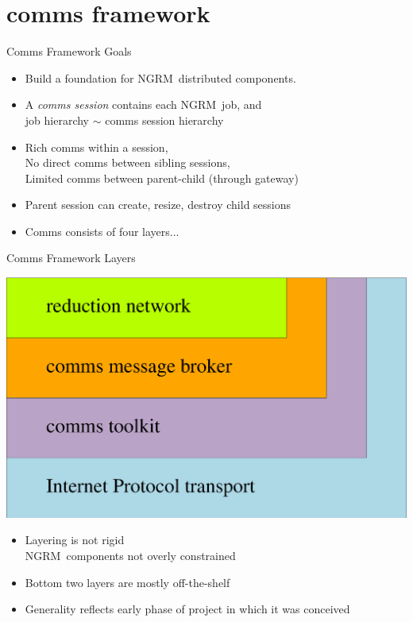 \documentclass[default,pdf,colorBG,slideColor]{prosper}
\newcommand{\ngrm}{NGRM}
\begin{document}
\part{comms framework}
\begin{slide}{Comms Framework Goals}{\small
\begin{itemize}
  \item{Build a foundation for \ngrm\ distributed components.}
  \item{A {\em comms session} contains each \ngrm\ job, and \\
	job hierarchy $\sim$ comms session hierarchy}
  \item{Rich comms within a session,\\
	No direct comms between sibling sessions,\\
        Limited comms between parent-child (through gateway)}
  \item{Parent session can create, resize, destroy child sessions}
  \item{Comms consists of four layers...}
\end{itemize}
}\end{slide}
\begin{slide}{Comms Framework Layers}{\small
\begin{center}
  \includegraphics[scale=0.20]{comms}
\end{center}
\begin{itemize}
  \item{Layering is not rigid\\
        \ngrm\ components not overly constrained}
  \item{Bottom two layers are mostly off-the-shelf}
  \item{Generality reflects early phase of project in which it was conceived}
\end{itemize}
}\end{slide}
\end{document}
